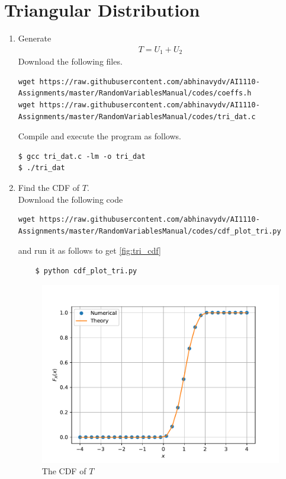 \documentclass[journal,12pt,twocolumn]{IEEEtran}
\renewcommand\thesection{\arabic{section}}
\begin{document}
\section{Triangular Distribution}
\begin{enumerate}[label=\thesection.\arabic*
        ,ref=\thesection.\theenumi]
    \item Generate
          \begin{align}
              T = U_1+U_2
          \end{align}
          \solution
          Download the following files.
          \begin{lstlisting}
wget https://raw.githubusercontent.com/abhinavydv/AI1110-Assignments/master/RandomVariablesManual/codes/coeffs.h
wget https://raw.githubusercontent.com/abhinavydv/AI1110-Assignments/master/RandomVariablesManual/codes/tri_dat.c
\end{lstlisting}

          Compile and execute the program as follows.
          \begin{lstlisting}
$ gcc tri_dat.c -lm -o tri_dat
$ ./tri_dat
\end{lstlisting}


    \item Find the CDF of $T$.\\
          \solution  Download the following code
          \begin{lstlisting}
wget https://raw.githubusercontent.com/abhinavydv/AI1110-Assignments/master/RandomVariablesManual/codes/cdf_plot_tri.py
\end{lstlisting}
          and run it as follows to get \autoref{fig:tri_cdf}
          \begin{lstlisting}
    $ python cdf_plot_tri.py
\end{lstlisting}
          \begin{figure}
              \centering
              \includegraphics[width=\columnwidth]{./figs/tri_cdf}
              \caption{The CDF of $T$}
              \label{fig:tri_cdf}
          \end{figure}


\end{enumerate}
\end{document}
